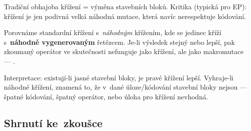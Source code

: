 \documentclass[11pt,a4paper]{article}
\theoremstyle{definition}
\begin{document}
Tradiční obhajoba křížení = výměna stavebních bloků. Kritika (typická pro EP):
křížení je jen podivná velká náhodná mutace, která navíc nerespektuje kódování.

\begin{defbox}
Porovnáme standardní křížení s~\emph{náhodným} křížením, kde se jedinec kříží
s~\textbf{náhodně vygenerovaným} řetězcem. Je-li výsledek stejný nebo lepší,
pak zkoumaný operátor ve skutečnosti nefunguje jako křížení, ale jako
makromutace --- .
\end{defbox}

Interpretace: existují-li jasné stavební bloky, je pravé křížení lepší.
Vyhraje-li náhodné křížení, znamená to, že v~dané úloze/kódování stavební
bloky nejsou --- špatné kódování, špatný operátor, nebo úloha pro křížení
nevhodná.

\subsection{Shrnutí ke~zkoušce}
\end{document}

